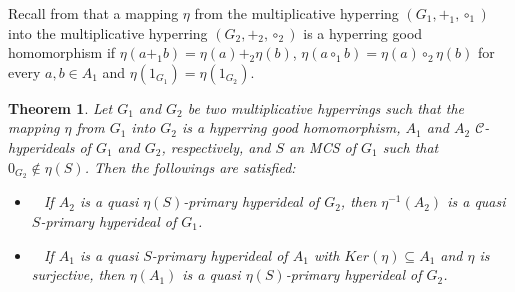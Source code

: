\documentclass[preprint,review,10pt]{amsart}
\newtheorem{theorem}{Theorem}[section]
\theoremstyle{definition}
\theoremstyle{remark}
\numberwithin{equation}{section}
\begin{document}
Recall from \cite{f10} that a mapping $\eta$ from the   multiplicative hyperring
$(G_1, +_1, \circ _1)$ into the   multiplicative hyperring $(G_2, +_2, \circ _2)$ is a hyperring good homomorphism if $\eta(a +_1 b) =\eta(a)+_2 \eta(b)$,  $\eta(a\circ_1 b) = \eta(a)\circ_2 \eta(b)$ for every $a,b \in A_1$ and $\eta(1_{G_1})=\eta(1_{G_2})$.

\begin{theorem} \label{homo} 
Let $G_1$ and $G_2$ be two  multiplicative hyperrings such that the mapping $\eta$ from $ G_1$ into $ G_2$ is a hyperring
good homomorphism, $A_1$ and $A_2$ $\mathcal{C}$-hyperideals of $G_1$ and $G_2$, respectively,  and $S$   an MCS of $G_1$ such that $0_{G_2} \notin \eta(S)$. Then the followings are satisfied:
\begin{itemize}
\item[\rm{(i)}]~ If $A_2$ is a  quasi $\eta(S)$-primary  hyperideal of $G_2$, then $\eta^{-1}(A_2)$ is a quasi $S$-primary  hyperideal  of $G_1$.
\item[\rm{(ii)}]~ If  $A_1$ is a quasi $S$-primary  hyperideal of $A_1$ with $Ker (\eta) \subseteq A_1$ and $\eta$ is surjective, then $\eta(A_1)$ is a quasi $\eta(S)$-primary  hyperideal of $G_2$.
\end{itemize}
\end{theorem}
\end{document}
